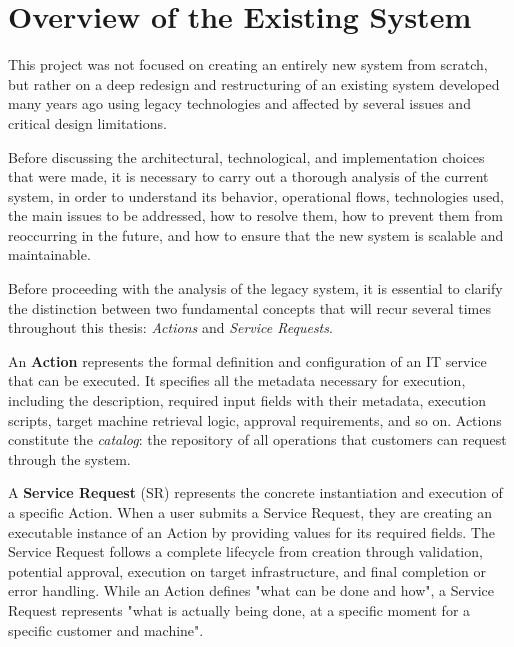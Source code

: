 \chapter{Overview of the Existing System}\label{ch:as-is}
This project was not focused on creating an entirely new system from scratch, but rather on a deep redesign and restructuring of an existing system developed many years ago using legacy technologies and affected by several issues and critical design limitations.

Before discussing the architectural, technological, and implementation choices that were made, it is necessary to carry out a thorough analysis of the current system, in order to understand its behavior, operational flows, technologies used, the main issues to be addressed, how to resolve them, how to prevent them from reoccurring in the future, and how to ensure that the new system is scalable and maintainable.

Before proceeding with the analysis of the legacy system, it is essential to clarify the distinction between two fundamental concepts that will recur several times throughout this thesis: \textit{Actions} and \textit{Service Requests}.

An \textbf{Action} represents the formal definition and configuration of an IT service that can be executed. It specifies all the metadata necessary for execution, including the description, required input fields with their metadata, execution scripts, target machine retrieval logic, approval requirements, and so on. Actions constitute the \textit{catalog}: the repository of all operations that customers can request through the system.


A \textbf{Service Request} (SR) represents the concrete instantiation and execution of a specific Action. When a user submits a Service Request, they are creating an executable instance of an Action by providing values for its required fields. The Service Request follows a complete lifecycle from creation through validation, potential approval, execution on target infrastructure, and final completion or error handling. While an Action defines "what can be done and how", a Service Request represents "what is actually being done, at a specific moment for a specific customer and machine".





